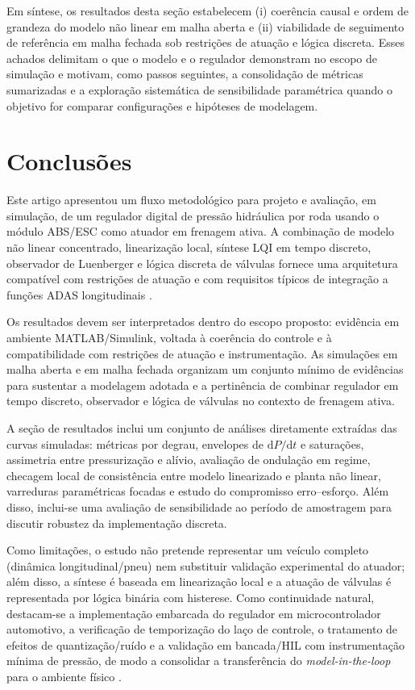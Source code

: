 \documentclass[a4paper]{ifacconf}
\begin{document}
Em síntese, os resultados desta seção estabelecem (i) coerência causal e ordem de grandeza do modelo não linear em malha aberta e (ii) viabilidade de seguimento de referência em malha fechada sob restrições de atuação e lógica discreta. Esses achados delimitam o que o modelo e o regulador demonstram no escopo de simulação e motivam, como passos seguintes, a consolidação de métricas sumarizadas e a exploração sistemática de sensibilidade paramétrica quando o objetivo for comparar configurações e hipóteses de modelagem.

\section{Conclusões}
\label{sec:conclusoes}
Este artigo apresentou um fluxo metodológico para projeto e avaliação, em simulação, de um regulador digital de pressão hidráulica por roda usando o módulo ABS/ESC como atuador em frenagem ativa. A combinação de modelo não linear concentrado, linearização local, síntese LQI em tempo discreto, observador de Luenberger e lógica discreta de válvulas fornece uma arquitetura compatível com restrições de atuação e com requisitos típicos de integração a funções ADAS longitudinais \cite{Lentin2022,Konrad2014}.

Os resultados devem ser interpretados dentro do escopo proposto: evidência em ambiente MATLAB/Simulink, voltada à coerência do controle e à compatibilidade com restrições de atuação e instrumentação. As simulações em malha aberta e em malha fechada organizam um conjunto mínimo de evidências para sustentar a modelagem adotada e a pertinência de combinar regulador em tempo discreto, observador e lógica de válvulas no contexto de frenagem ativa.

A seção de resultados inclui um conjunto de análises diretamente extraídas das curvas simuladas: métricas por degrau, envelopes de $\mathrm{d}P/\mathrm{d}t$ e saturações, assimetria entre pressurização e alívio, avaliação de ondulação em regime, checagem local de consistência entre modelo linearizado e planta não linear, varreduras paramétricas focadas e estudo do compromisso erro--esforço. Além disso, inclui-se uma avaliação de sensibilidade ao período de amostragem para discutir robustez da implementação discreta.

Como limitações, o estudo não pretende representar um veículo completo (dinâmica longitudinal/pneu) nem substituir validação experimental do atuador; além disso, a síntese é baseada em linearização local e a atuação de válvulas é representada por lógica binária com histerese. Como continuidade natural, destacam-se a implementação embarcada do regulador em microcontrolador automotivo, a verificação de temporização do laço de controle, o tratamento de efeitos de quantização/ruído e a validação em bancada/HIL com instrumentação mínima de pressão, de modo a consolidar a transferência do \textit{model-in-the-loop} para o ambiente físico \cite{KapinskiJamesDeshmukh2016}.
\end{document}
